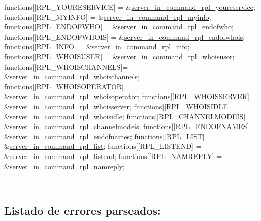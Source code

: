\begin{DoxyCode}
functions[[RPL\_YOURESERVICE] = &\hyperlink{G-2313-06-P2__client__function__handlers_8h_a9a54a1989e86596904bc4d1c2618ba84}{server\_in\_command\_rpl\_youreservice};
functions[[RPL\_MYINFO]       = &\hyperlink{G-2313-06-P2__client__function__handlers_8h_aa4c4d377b1cde9f0b40997a54c81c3de}{server\_in\_command\_rpl\_myinfo};
functions[[RPL\_ENDOFWHO]     = &\hyperlink{G-2313-06-P2__client__function__handlers_8h_a441993de1d4be974fab21e17aacc553e}{server\_in\_command\_rpl\_endofwho};
functions[[RPL\_ENDOFWHOIS]   = &\hyperlink{G-2313-06-P2__client__function__handlers_8h_a56185c77cfea8620c1ce413a44865bc4}{server\_in\_command\_rpl\_endofwhois};
functions[[RPL\_INFO]         = &\hyperlink{G-2313-06-P2__client__function__handlers_8h_a6477df39f199931be3274e311a18b276}{server\_in\_command\_rpl\_info};
functions[[RPL\_WHOISUSER]    = &\hyperlink{G-2313-06-P2__client__function__handlers_8h_af2190c9ca68abe019cde6f3a18e380c2}{server\_in\_command\_rpl\_whoisuser};
functions[[RPL\_WHOISCHANNELS]= &\hyperlink{G-2313-06-P2__client__function__handlers_8h_a7ed4d1bd7f485fe7c6d26bd1d8eef662}{server\_in\_command\_rpl\_whoischannels};
functions[[RPL\_WHOISOPERATOR]= &\hyperlink{G-2313-06-P2__client__function__handlers_8h_a890fb67530ca5c1f5c14da877fc9ba21}{server\_in\_command\_rpl\_whoisoperator};
functions[[RPL\_WHOISSERVER]  = &\hyperlink{G-2313-06-P2__client__function__handlers_8h_a27bc970f66b7e5a2f3806853c3fa156f}{server\_in\_command\_rpl\_whoisserver};
functions[[RPL\_WHOISIDLE]    = &\hyperlink{G-2313-06-P2__client__function__handlers_8h_ada14de5a081899ca2b5eccbfb9779d62}{server\_in\_command\_rpl\_whoisidle};
functions[[RPL\_CHANNELMODEIS]= &\hyperlink{G-2313-06-P2__client__function__handlers_8h_a23ae57a558e401f83bc03209efb34be2}{server\_in\_command\_rpl\_channelmodeis};
functions[[RPL\_ENDOFNAMES]   = &\hyperlink{G-2313-06-P2__client__function__handlers_8h_a11fdd753a098bb69dc7ca93a89433abb}{server\_in\_command\_rpl\_endofnames};
functions[[RPL\_LIST]         = &\hyperlink{G-2313-06-P2__client__function__handlers_8h_a032cc47903f14a4fbdcec9e54f6a8e4a}{server\_in\_command\_rpl\_list};
functions[[RPL\_LISTEND]      = &\hyperlink{G-2313-06-P2__client__function__handlers_8h_ad4a1e3d492ae6907a5e15e92cb9b69f7}{server\_in\_command\_rpl\_listend};
functions[[RPL\_NAMREPLY]     = &\hyperlink{G-2313-06-P2__client__function__handlers_8h_a770ed57ba6c48c4a349208439e3f19ef}{server\_in\_command\_rpl\_namreply};
\end{DoxyCode}
 ~\newline
\subsection*{Listado de errores parseados\+:}


